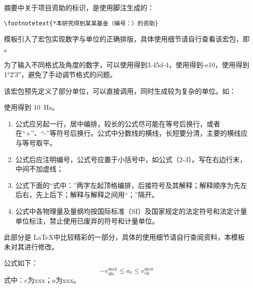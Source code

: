 摘要中关于项目资助的标识，是使用脚注生成的：

\begin{tcolorbox}
  \lstinline|\footnotetext{*本研究得到某某基金（编号：）的资助}|
\end{tcolorbox}


\clearpage



模板引入了宏包实现数字与单位的正确排版，具体使用细节请自行查看该宏包，即 。

为了输入不同格式及角度的数字，可以使用得到\num{3.45d-4}，使用得到\num{-e10}，使用得到\ang{1;2;3}，避免了手动调节格式的问题。

该宏包预先定义了部分单位，可以直接调用，同时生成较为复杂的单位。如：

使用得到 \SI{10}{\hertz}。



\begin{tcolorbox}[colback=red!5!white,colframe=red!75!black]
  \begin{enumerate}[leftmargin=0.5cm]
    \item 公式应另起一行，居中编排，较长的公式尽可能在等号后换行，或者在“+”、“-”等符号后换行。公式中分数线的横线，长短要分清，主要的横线应与等号取平。
    \item 公式后应注明编号，公式号应置于小括号中，如公式（2-3）。写在右边行末，中间不加虚线；
    \item 公式下面的“式中：”两字左起顶格编排，后接符号及其解释；解释顺序为先左后右，先上后下；解释与解释之间用“；”隔开。
    \item 公式中各物理量及量纲均按国际标准（SI）及国家规定的法定符号和法定计量单位标注，禁止使用已废弃的符号和计量单位。
  \end{enumerate}
\end{tcolorbox}

此部分是 \LaTeX 中比较精彩的一部分，具体的使用细节请自行查阅资料，本模板未对其进行修改。

\begin{texcode}[]{}
  公式如下：
  \begin{equation}
      -e^{\max}_\text{dis} \leq a_t \leq e^{\max}_\text{ch}\label{eqn:c1:mdl:constraint_discharge}
  \end{equation}
  式中：$e$为xxx；$a$为xxx。
\end{texcode}

